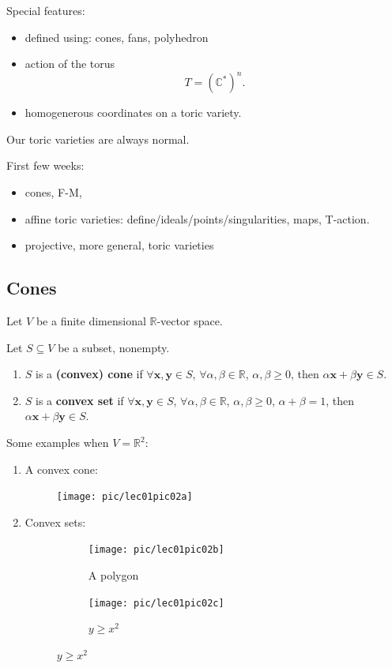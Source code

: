 \documentclass[a4paper,12pt]{amsart}
\newcommand{\RR}{\mathbb{R}}
\newcommand{\CC}{\mathbb{C}}
\newcommand{\bfx}{\mathbf{x}}
\newcommand{\bfy}{\mathbf{y}}
\begin{document}
Special features:
\begin{itemize}
\item defined using: cones, fans, polyhedron
\item action of the torus
\begin{equation*}
T=(\CC^*)^n.
\end{equation*}
\item homogenerous coordinates on a toric variety.
\end{itemize}

\begin{Caution}
Our toric varieties are always normal.
\end{Caution}
First few weeks:
\begin{itemize} 
\item cones, F-M,
\item affine toric varieties: define/ideals/points/singularities, maps, T-action.
\item projective, more general, toric varieties
\end{itemize} 
\subsection{Cones}
Let $V$ be a finite dimensional $\RR$-vector space.
\begin{Def}
Let $S\subseteq V$ be a subset, nonempty.
\begin{enumerate}
\item $S$ is a \textbf{(convex) cone} if $\forall \bfx,\bfy\in S$, $\forall \alpha,\beta\in\RR$, $\alpha,\beta\geq 0$, then $\alpha \bfx+\beta \bfy\in S$.
\item $S$ is a \textbf{convex set} if $\forall \bfx,\bfy\in S$, $\forall \alpha,\beta\in\RR$, $\alpha,\beta\geq 0$, $\alpha+\beta=1$, then $\alpha \bfx+\beta \bfy\in S$.
\end{enumerate}
\end{Def}
\begin{Eg}Some examples when $V=\RR^2$:
\begin{enumerate}
\item A convex cone:
\begin{figure}[h]
\centering
\texttt{[image: pic/lec01pic02a]}
\end{figure}
\item Convex sets:
\begin{figure}[h]
\centering
\begin{subfigure}{.5\textwidth}
  \centering
  \texttt{[image: pic/lec01pic02b]}
  \caption{A polygon}
  \label{fig:sub1}
\end{subfigure}%
\begin{subfigure}{.5\textwidth}
  \centering
  \texttt{[image: pic/lec01pic02c]}
  \caption{$y\geq x^2$}
  \label{fig:sub2}
\end{subfigure}
\label{fig:test}
\end{figure}
\end{enumerate}
\end{Eg}
\end{document}
